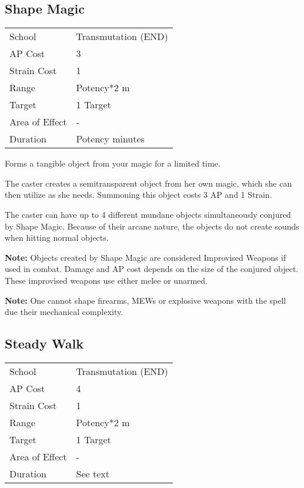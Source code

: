 \documentclass[11pt,a4paper,twocolumn]{book}
\begin{document}
\vfill

\subsection*{Shape Magic}

{
	\begin{tabu} to 75mm{| X[l,4] | X[l,7] |}
		\hline
		School 			& Transmutation (END) 	\\
		AP Cost	      	& 3 					\\
		Strain Cost     & 1 					\\
		Range     		& Potency*2	m			\\
		Target      	& 1 Target				\\
		Area of Effect  & -  	 				\\
		Duration     	& Potency minutes		\\ \hline
	\end{tabu}
	
}

\medskip

Forms a tangible object from your magic for a limited time.

The caster creates a semitransparent object from her own magic, which she can then utilize as she needs. Summoning this object costs 3 AP and 1 Strain.

The caster can have up to 4 different mundane objects simultaneously conjured by Shape Magic. Because of their arcane nature, the objects do not create sounds when hitting normal objects.

\textbf{Note:} Objects created by Shape Magic are considered Improvised Weapons if used in combat. Damage and AP cost depends on the size of the conjured object. These improvised weapons use either melee or unarmed.

\textbf{Note:} One cannot shape firearms, MEWs or explosive weapons with the spell due their mechanical complexity.


\subsection*{Steady Walk}
{
	\begin{tabu} to 75mm{| X[l,4] | X[l,7] |}
		\hline
		School 			& Transmutation (END) 	\\
		AP Cost	      	& 4 					\\
		Strain Cost     & 1 					\\
		Range     		& Potency*2 m			\\
		Target      	& 1 Target				\\
		Area of Effect  & - 	 				\\
		Duration     	& See text	            \\ \hline
	\end{tabu}
	
}
\end{document}
